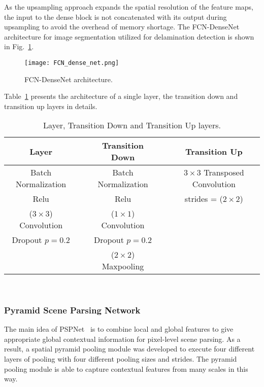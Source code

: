As the upsampling approach expands the spatial resolution of the feature maps, the input to the dense block is not concatenated with its output during upsampling to avoid the overhead of memory shortage.
The FCN-DenseNet architecture for image segmentation utilized for delamination detection is shown in Fig.~\ref{fcn}.
\begin{figure} [h!]
	\begin{center}
		\texttt{[image: FCN\_dense\_net.png]}
	\end{center}
	\caption{FCN-DenseNet architecture.} 
	\label{fcn}
\end{figure}
Table~\ref{layers} presents the architecture of a single layer, the transition down  and transition up layers in details.
\begin{table}[h!]
	\renewcommand{\arraystretch}{1.3}
	\centering
	\scriptsize
	\resizebox{\textwidth}{!}
	{
		\begin{tabular}{ccccc}
			\hline
			Layer &  &  Transition Down &  &  Transition Up \\ 
			\hline
			Batch Normalization &  & Batch Normalization &  &  \(3\times 3\) Transposed Convolution  \\ 
			Relu &  & Relu &  & strides = (\(2\times2\))  \\ 
			(\(3\times3\)) Convolution &  & (\(1\times1\)) Convolution &  &  \\ 
			Dropout \(p=0.2\) &  &Dropout \(p=0.2\)  &  &  \\ 
			&  & (\(2\times2\)) Maxpooling &  &  \\ 
			\hline
		\end{tabular}
	}
	\caption{Layer, Transition Down and Transition Up layers.} 
	\label{layers}	
\end{table}\\
\subsubsection{Pyramid Scene Parsing Network}
The main idea of PSPNet~\cite{zhao2017pyramid} is to combine local and global features to give appropriate global contextual information for pixel-level scene parsing.
As a result, a spatial pyramid pooling module was developed to execute four different layers of pooling with four different pooling sizes and strides.
The pyramid pooling module is able to capture contextual features from many scales in this way.

